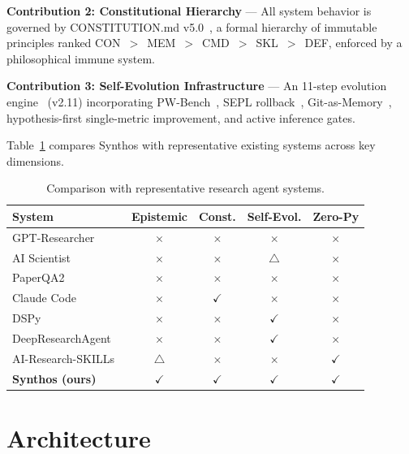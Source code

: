 \documentclass[review]{elsarticle}
\begin{document}
\textbf{Contribution 2: Constitutional Hierarchy} --- All system behavior is governed by CONSTITUTION.md v5.0~\cite{yang2026synthosconst}, a formal hierarchy of immutable principles ranked CON~$>$~MEM~$>$~CMD~$>$~SKL~$>$~DEF, enforced by a philosophical immune system.

\textbf{Contribution 3: Self-Evolution Infrastructure} --- An 11-step evolution engine~\cite{yang2026synthos} (v2.11) incorporating PW-Bench~\cite{song2026paperorchestra}, SEPL rollback~\cite{skyworkai2026deep}, Git-as-Memory~\cite{haiyang2025aris}, hypothesis-first single-metric improvement, and active inference gates.

Table~\ref{tab:comparison} compares Synthos with representative existing systems across key dimensions.

\begin{table}[h]\centering\caption{Comparison with representative research agent systems.}\label{tab:comparison}
\small
\begin{tabular}{lcccc}\toprule
\textbf{System} & \textbf{Epistemic} & \textbf{Const.} & \textbf{Self-Evol.} & \textbf{Zero-Py}\\\midrule
GPT-Researcher~\cite{elovic2024gpt} & $\times$ & $\times$ & $\times$ & $\times$\\
AI Scientist~\cite{sakana2025ai} & $\times$ & $\times$ & $\bigtriangleup$ & $\times$\\
PaperQA2~\cite{futurehouse2025paperqa2} & $\times$ & $\times$ & $\times$ & $\times$\\
Claude Code~\cite{anthropic2025claude} & $\times$ & $\checkmark$ & $\times$ & $\times$\\ 
DSPy~\cite{khattab2023dspy} & $\times$ & $\times$ & $\checkmark$ & $\times$\\
DeepResearchAgent~\cite{skyworkai2026deep} & $\times$ & $\times$ & $\checkmark$ & $\times$\\
AI-Research-SKILLs~\cite{orchestra2026airesearch} & $\bigtriangleup$ & $\times$ & $\times$ & $\checkmark$\\
\textbf{Synthos (ours)} & $\checkmark$ & $\checkmark$ & $\checkmark$ & $\checkmark$\\\bottomrule
\end{tabular}
\end{table}

\section{Architecture}
\end{document}
